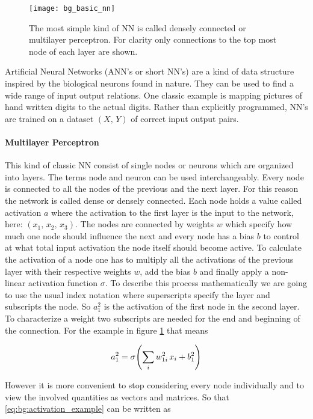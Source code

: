 \begin{figure}[H]
    \centering
    \texttt{[image: bg\_basic\_nn]}
    \caption{The most simple kind of NN is called densely connected or multilayer perceptron. For clarity only connections to the top most node of each layer are shown.}
    \label{fig:bg:basic_nn}
\end{figure}

Artificial Neural Networks (ANN's or short NN's) are a kind of data structure inspired by the biological neurons found in nature. They can be used to find a wide range of input output relations. One classic example is mapping pictures of hand written digits to the actual digits. Rather than explicitly programmed, NN's are trained on a dataset $(X, \, Y)$ of correct input output pairs.


\paragraph{Multilayer Perceptron}
This kind of classic NN consist of single nodes or neurons which are organized into layers. The terms node and neuron can be used interchangeably. Every node is connected to all the nodes of the previous and the next layer. For this reason the network is called dense or densely connected. Each node holds a value called activation $a$ where the activation to the first layer is the input to the network, here:
$(x_1, \, x_2, \, x_3)$.
The nodes are connected by weights $w$ which specify how much one node should influence the next and every node has a bias $b$ to control at what total input activation the node itself should become active.
To calculate the activation of a node one has to multiply all the activations of the previous layer with their respective weights $w$, add the bias $b$ and finally apply a non-linear activation function $\sigma$. To describe this process mathematically we are going to use the usual index notation where superscripts specify the layer and subscripts the node. So $a^2_1$ is the activation of the first node in the second layer. To characterize a weight two subscripts are needed for the end and beginning of the connection. For the example in figure \ref{fig:bg:basic_nn} that means

\begin{equation} \label{eq:bg:activation_example}
    a^2_1 = \sigma \qty(\sum_i w^2_{1i} \, x_i + b^2_1)
\end{equation}

\noindent
However it is more convenient to stop considering every node individually and to view the involved quantities as vectors and matrices. So that \eqref{eq:bg:activation_example} can be written as

